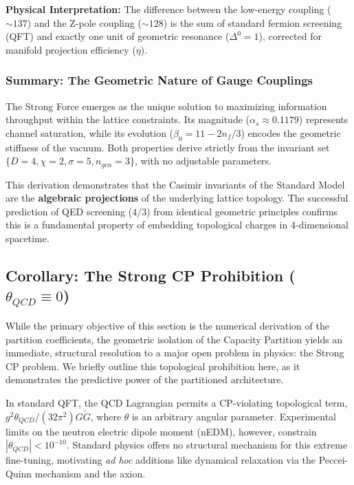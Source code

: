 \textbf{Physical Interpretation:} The difference between the low-energy coupling ($\sim 137$) and the Z-pole coupling ($\sim 128$) is the sum of standard fermion screening (QFT) and exactly one unit of geometric resonance ($\Delta^0=1$), corrected for manifold projection efficiency ($\eta$).

\subsubsection{Summary: The Geometric Nature of Gauge Couplings}
The Strong Force emerges as the unique solution to maximizing information throughput within the lattice constraints. Its magnitude ($\alpha_s \approx 0.1179$) represents channel saturation, while its evolution ($\beta_0 = 11 - 2n_f/3$) encodes the geometric stiffness of the vacuum. Both properties derive strictly from the invariant set $\{D=4, \chi=2, \sigma=5, n_{gen}=3\}$, with no adjustable parameters.

This derivation demonstrates that the Casimir invariants of the Standard Model are the \textbf{algebraic projections} of the underlying lattice topology. The successful prediction of QED screening ($4/3$) from identical geometric principles confirms this is a fundamental property of embedding topological charges in 4-dimensional spacetime.

\subsection{Corollary: The Strong CP Prohibition (\texorpdfstring{$\theta_{QCD} \equiv 0$}{theta\_QCD = 0})}
\label{sec:strong_cp_prohibition}

While the primary objective of this section is the numerical derivation of the partition coefficients, the geometric isolation of the Capacity Partition yields an immediate, structural resolution to a major open problem in physics: the Strong CP problem. We briefly outline this topological prohibition here, as it demonstrates the predictive power of the partitioned architecture.

In standard QFT, the QCD Lagrangian permits a CP-violating topological term, $g^2\theta_{QCD}/(32\pi^2) G\tilde{G}$, where $\theta$ is an arbitrary angular parameter. Experimental limits on the neutron electric dipole moment (nEDM), however, constrain $|\theta_{QCD}| < 10^{-10}$. Standard physics offers no structural mechanism for this extreme fine-tuning, motivating \textit{ad hoc} additions like dynamical relaxation via the Peccei-Quinn mechanism and the axion.

